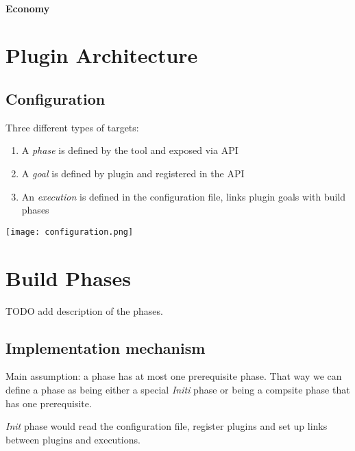 \documentclass[11pt]{article}
\begin{document}
\paragraph{Economy}

\section{Plugin Architecture}
\subsection{Configuration}
Three different types of targets:
\begin{enumerate}
\item A \textit{phase} is defined by the tool and exposed via API
\item A \textit{goal} is defined by plugin and registered in the API
\item An \textit{execution} is defined in the configuration file, links plugin goals with build phases
\end{enumerate}

\texttt{[image: configuration.png]}

\section{Build Phases}
TODO add description of the phases.

\subsection{Implementation mechanism}
Main assumption: a phase has at most one prerequisite phase. That way we can
define a phase as being either a special \textit{Initi} phase or being a
compsite phase that has one prerequisite.

\textit{Init} phase would read the configuration file, register plugins and set
up links between plugins and executions.
\end{document}
